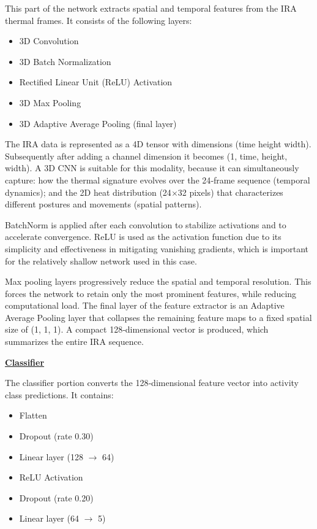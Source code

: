This part of the network extracts spatial and temporal features from the IRA thermal frames. It consists of the following layers:
\begin{itemize}
    \item 3D Convolution
    \item 3D Batch Normalization
    \item Rectified Linear Unit (ReLU) Activation
    \item 3D Max Pooling
    \item 3D Adaptive Average Pooling (final layer)
\end{itemize}

The IRA data is represented as a 4D tensor with dimensions (time height width). Subsequently after adding a channel dimension it becomes (1, time, height, width). A 3D CNN is suitable for this modality, because it can simultaneously capture: how the thermal signature evolves over the 24‑frame sequence (temporal dynamics); and the 2D heat distribution (24\(\times\)32 pixels) that characterizes different postures and movements (spatial patterns).

BatchNorm is applied after each convolution to stabilize activations and to accelerate convergence. ReLU is used as the activation function due to its simplicity and effectiveness in mitigating vanishing gradients, which is important for the relatively shallow network used in this case.

Max pooling layers progressively reduce the spatial and temporal resolution. This forces the network to retain only the most prominent features, while reducing computational load. The final layer of the feature extractor is an Adaptive Average Pooling layer that collapses the remaining feature maps to a fixed spatial size of (1, 1, 1). A compact 128‑dimensional vector is produced, which summarizes the entire IRA sequence.

\textbf{\underline{Classifier}}

The classifier portion converts the 128‑dimensional feature vector into activity class predictions. It contains:
\begin{itemize}
    \item Flatten
    \item Dropout (rate 0.30)
    \item Linear layer (128 \(\rightarrow\) 64)
    \item ReLU Activation
    \item Dropout (rate 0.20)
    \item Linear layer (64 \(\rightarrow\) 5)
\end{itemize}

